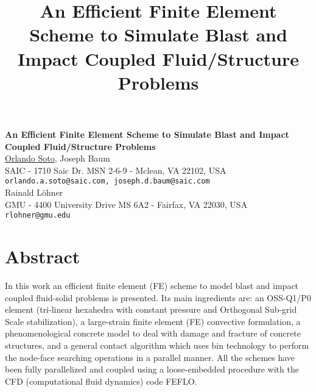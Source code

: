 \title{An Efficient Finite Element Scheme to Simulate Blast and Impact Coupled Fluid/Structure Problems}
\author{} \institute{}

\begin{center}

\textbf{\Large An Efficient Finite Element Scheme to Simulate Blast and Impact Coupled Fluid/Structure Problems}\\
\vspace{10mm}
{\large \underline{Orlando Soto}, Joseph Baum}\\
SAIC - 1710 Saic Dr. MSN 2-6-9 - Mclean, VA 22102, USA\\
{\tt orlando.a.soto@saic.com, joseph.d.baum@saic.com}\\
\vspace{4mm}
{\large Rainald L\"ohner}\\
GMU - 4400 University Drive MS 6A2 - Fairfax, VA 22030, USA\\
{\tt rlohner@gmu.edu}
\end{center}

\section*{Abstract}

In this work an efficient finite element (FE) scheme to model blast and impact coupled fluid-solid problems is presented. Its main ingredients are: an OSS-Q1/P0 element (tri-linear hexahedra with constant pressure and Orthogonal Sub-grid Scale stabilization), a large-strain finite  element (FE) convective formulation, a phenomenological concrete model to  deal with damage and fracture of concrete structures, and a general contact algorithm  which uses bin technology to perform the node-face searching operations in a parallel manner. All the schemes have been fully parallelized and coupled using a loose-embedded procedure with the CFD (computational fluid dynamics) code FEFLO.


